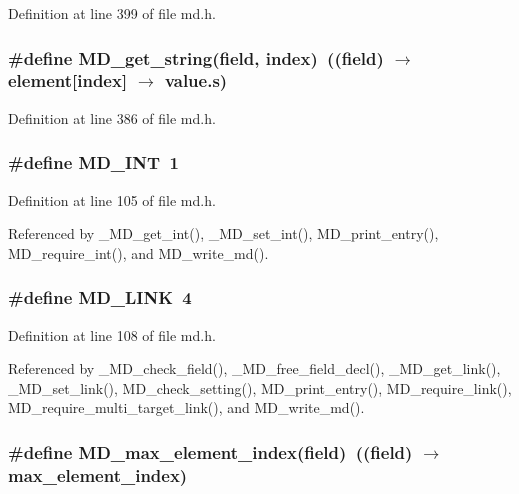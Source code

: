 Definition at line 399 of file md.h.
\subsubsection{\setlength{\rightskip}{0pt plus 5cm}\#define MD\_\-get\_\-string(field, index)~((field) $\rightarrow$ element[index] $\rightarrow$ value.s)}\label{md_8h_071dc413a821b518ca716a2a4fdb638a}




Definition at line 386 of file md.h.
\subsubsection{\setlength{\rightskip}{0pt plus 5cm}\#define MD\_\-INT~1}\label{md_8h_1bae96f31ca512cf27a95ab6f96f4d89}




Definition at line 105 of file md.h.

Referenced by \_\-MD\_\-get\_\-int(), \_\-MD\_\-set\_\-int(), MD\_\-print\_\-entry(), MD\_\-require\_\-int(), and MD\_\-write\_\-md().
\subsubsection{\setlength{\rightskip}{0pt plus 5cm}\#define MD\_\-LINK~4}\label{md_8h_832ab6cc636240c071152b8bd2824ff9}




Definition at line 108 of file md.h.

Referenced by \_\-MD\_\-check\_\-field(), \_\-MD\_\-free\_\-field\_\-decl(), \_\-MD\_\-get\_\-link(), \_\-MD\_\-set\_\-link(), MD\_\-check\_\-setting(), MD\_\-print\_\-entry(), MD\_\-require\_\-link(), MD\_\-require\_\-multi\_\-target\_\-link(), and MD\_\-write\_\-md().
\subsubsection{\setlength{\rightskip}{0pt plus 5cm}\#define MD\_\-max\_\-element\_\-index(field)~((field) $\rightarrow$ max\_\-element\_\-index)}\label{md_8h_4cf11644283a4d46fb0651b48c598d2b}




